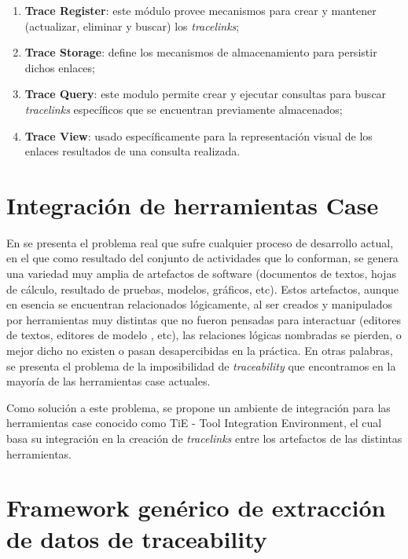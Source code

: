 \documentclass[a4paper,12pt,twoside,spanish,openright]{book}
\begin{document}
\begin{enumerate}
\item \textbf{Trace Register}: este módulo provee mecanismos para crear y mantener (actualizar, eliminar y buscar) los \textit{tracelinks};
\item \textbf{Trace Storage}: define los mecanismos de almacenamiento para persistir dichos enlaces;
\item \textbf{Trace Query}: este modulo permite crear y ejecutar consultas para buscar \textit{tracelinks} específicos que se encuentran previamente almacenados;
\item \textbf{Trace View}: usado específicamente para la representación visual de los enlaces resultados de una consulta realizada.
\end{enumerate}


\section{Integración de herramientas Case}

En \cite{KlarRoseSchurr} se presenta el problema real que sufre cualquier proceso de desarrollo actual, en el que como resultado del conjunto de actividades que lo conforman, se genera una variedad muy amplia de artefactos de software (documentos de textos, hojas de cálculo, resultado de pruebas, modelos, gráficos, etc). Estos artefactos, aunque en esencia se encuentran relacionados lógicamente, al ser creados y manipulados por herramientas muy distintas que no fueron pensadas para interactuar (editores de textos, editores de modelo , etc), las relaciones lógicas nombradas se pierden, o mejor dicho no existen o pasan desapercibidas en la práctica. En otras palabras, se presenta el problema de la imposibilidad de \textit{traceability} que encontramos en la mayoría de las herramientas \gls{case} actuales.

Como solución a este problema, se propone un ambiente de integración para las herramientas \gls{case} conocido como \textsf{TiE} - Tool Integration Environment, el cual basa su integración en la creación de \textit{tracelinks} entre los artefactos de las distintas herramientas.

\section{Framework genérico de extracción de datos de traceability}
\label{sec:Trace-DSL}
\end{document}
